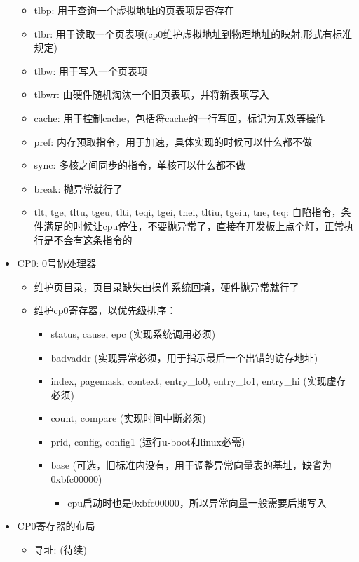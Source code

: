 \documentclass[lang=cn,11pt,a4paper]{elegantpaper}
\begin{document}
\begin{itemize}
\begin{itemize}
  \item tlbp: 用于查询一个虚拟地址的页表项是否存在
  \item tlbr: 用于读取一个页表项(cp0维护虚拟地址到物理地址的映射,形式有标准规定)
  \item tlbw: 用于写入一个页表项
  \item tlbwr: 由硬件随机淘汰一个旧页表项，并将新表项写入
  \item cache: 用于控制cache，包括将cache的一行写回，标记为无效等操作
  \item pref: 内存预取指令，用于加速，具体实现的时候可以什么都不做
  \item sync: 多核之间同步的指令，单核可以什么都不做
  \item break: 抛异常就行了
  \item tlt, tge, tltu, tgeu, tlti, teqi, tgei, tnei, tltiu, tgeiu, tne, teq: 自陷指令，条件满足的时候让cpu停住，不要抛异常了，直接在开发板上点个灯，正常执行是不会有这条指令的
  \end{itemize}
\item CP0: 0号协处理器
  \begin{itemize}
  \item 维护页目录，页目录缺失由操作系统回填，硬件抛异常就行了
  \item 维护cp0寄存器，以优先级排序：
    \begin{itemize}
    \item status, cause, epc (实现系统调用必须)
	\item badvaddr (实现异常必须，用于指示最后一个出错的访存地址)
	\item index, pagemask, context, entry\_lo0, entry\_lo1, entry\_hi (实现虚存必须)
	\item count, compare (实现时间中断必须)
	\item prid, config, config1 (运行u-boot和linux必需)
	\item base (可选，旧标准内没有，用于调整异常向量表的基址，缺省为0xbfc00000)
      \begin{itemize}
	  \item cpu启动时也是0xbfc00000，所以异常向量一般需要后期写入
      \end{itemize}
    \end{itemize}
  \end{itemize}
\item CP0寄存器的布局
  \begin{itemize}
  \item 寻址: (待续)
  \end{itemize}
\end{itemize}
\end{document}
